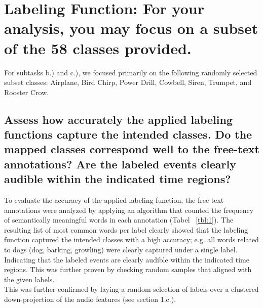 
\section{Labeling Function: {\normalfont\normalsize For your analysis, you may focus on a subset of the 58 classes provided.}}
\label{sec:Labeling Function}

For subtasks b.) and c.), we focused primarily on the following randomly selected subset classes: Airplane, Bird Chirp, Power Drill, Cowbell, Siren, Trumpet, and Rooster Crow.

\subsection{Assess how accurately the applied labeling functions capture the intended classes. Do the mapped classes correspond well to the free-text annotations? Are the labeled events clearly audible within the indicated time regions?}
\label{sec:Labeling Function:a}
To evaluate the accuracy of the applied labeling function, the free text annotations were analyzed by applying an algorithm that counted the frequency of semantically meaningful words in each annotation (Tabel ~\ref{tbl:1}).
The resulting list of most common words per label clearly showed that the labeling function captured the intended classes with a high accuracy; e.g. all words related to dogs (dog, barking, growling) were clearly captured under a single label. Indicating that the labeled events are clearly audible within the indicated time regions. This was further proven by checking random samples that aligned with the given labels. \\
This was further confirmed by laying a random selection of labels over a clustered down-projection of the audio features (see section 1.c.).




